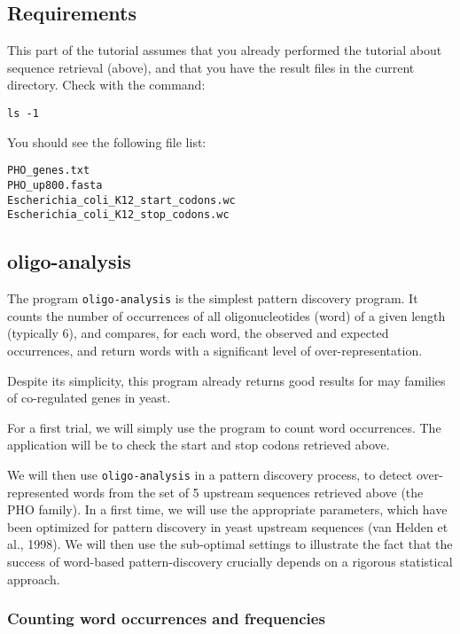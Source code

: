 \subsection{Requirements}
This part of the tutorial assumes that you already performed the
tutorial about sequence retrieval (above), and that you have the
result files in the current directory. Check with the command:

\begin{verbatim}
ls -1
\end{verbatim}

You should see the following file list:
\begin{verbatim}
PHO_genes.txt
PHO_up800.fasta
Escherichia_coli_K12_start_codons.wc
Escherichia_coli_K12_stop_codons.wc
\end{verbatim}

\subsection{oligo-analysis}

The program \texttt{oligo-analysis} is the simplest pattern discovery
program. It counts the number of occurrences of all oligonucleotides
(word) of a given length (typically 6), and compares, for each word,
the observed and expected occurrences, and return words with a
significant level of over-representation.  

Despite its simplicity, this program already returns good results for
may families of co-regulated genes in yeast.

For a first trial, we will simply use the program to count word
occurrences. The application will be to check the start and stop
codons retrieved above.

We will then use \texttt{oligo-analysis} in a pattern discovery
process, to detect over-represented words from the set of 5 upstream
sequences retrieved above (the PHO family).  In a first time, we will
use the appropriate parameters, which have been optimized for pattern
discovery in yeast upstream sequences (van Helden et al., 1998). We
will then use the sub-optimal settings to illustrate the fact that the
success of word-based pattern-discovery crucially depends on a
rigorous statistical approach.

\subsubsection{Counting word occurrences and frequencies}

